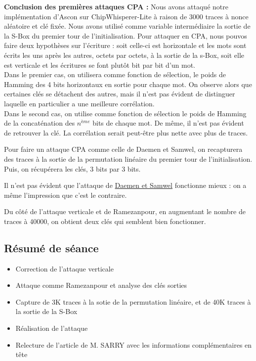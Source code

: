 \documentclass[12pt]{article}
\begin{document}
	\noindent \textbf{Conclusion des premières attaques CPA :} Nous avons attaqué notre implémentation d'Ascon sur ChipWhisperer-Lite à raison de 3000 traces à nonce aléatoire et clé fixée. Nous avons utilisé comme variable intermédiaire la sortie de la S-Box du premier tour de l'initialisation. Pour attaquer en CPA, nous pouvos faire deux hypothèses sur l'écriture : soit celle-ci est horizontale et les mots sont écrits les uns après les autres, octets par octets, à la sortie de la s-Box, soit elle est verticale et les écritures se font plutôt bit par bit d'un mot.\\
	Dans le premier cas, on utilisera comme fonction de sélection, le poids de Hamming des 4 bits horizontaux en sortie pour chaque mot. On observe alors que certaines clés se détachent des autres, mais il n'est pas évident de distinguer laquelle en particulier a une meilleure corrélation.\\
	Dans le second cas, on utilise comme fonction de sélection le poids de Hamming de la concaténation des $n^{ème}$ bits de chaque mot. De même, il n'est pas évident de retrouver la clé. La corrélation serait peut-être plus nette avec plus de traces.
	
	Pour faire un attaque CPA comme celle de Daemen et Samwel, on recapturera des traces à la sortie de la permutation linéaire du premier tour de l'initialisation. Puis, on récupérera les clés, 3 bits par 3 bits.
	
	Il n'est pas évident que l'attaque de \href{https://dl.acm.org/doi/pdf/10.1145/3075564.3079067}{Daemen et Samwel} fonctionne mieux : on a même l'impression que c'est le contraire.
	
	Du côté de l'attaque verticale et de Ramezanpour, en augmentant le nombre de traces à 40000, on obtient deux clés qui semblent bien fonctionner.
	
	\subsection{Résumé de séance}
	\begin{itemize}
		\item Correction de l'attaque verticale
		\item Attaque comme Ramezanpour et analyse des clés sorties
		\item Capture de 3K traces à la sotie de la permutation linéaire, et de 40K traces à la sortie de la S-Box
		\item Réalisation de l'attaque
		\item Relecture de l'article de M. SARRY avec les informations complémentaires en tête
	\end{itemize}
	
\end{document}
